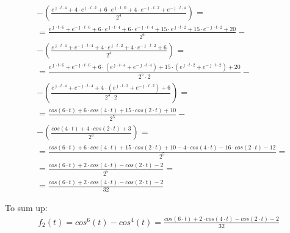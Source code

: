 \begin{task}
\begin{align*}
&-\left(\frac{e^{\jmath \cdot t \cdot 4} + 4 \cdot e^{\jmath \cdot t \cdot 2} + 6 \cdot e^{\jmath \cdot t \cdot 0} + 4 \cdot e^{-\jmath \cdot t \cdot 2} + e^{-\jmath \cdot t \cdot 4}}{2^4}\right)=\\
&=\frac{e^{\jmath \cdot t \cdot 6} + e^{-\jmath \cdot t \cdot 6} + 6 \cdot e^{\jmath \cdot t \cdot 4} + 6 \cdot e^{-\jmath \cdot t \cdot 4}  + 15 \cdot e^{\jmath \cdot t \cdot 2} + 15 \cdot e^{-\jmath \cdot t \cdot 2} + 20}{2^6} - \\
&-\left(\frac{e^{\jmath \cdot t \cdot 4} + e^{-\jmath \cdot t \cdot 4} + 4 \cdot e^{\jmath \cdot t \cdot 2} + 4 \cdot e^{-\jmath \cdot t \cdot 2} + 6}{2^4}\right)=\\
&=\frac{e^{\jmath \cdot t \cdot 6} + e^{-\jmath \cdot t \cdot 6} + 6 \cdot (e^{\jmath \cdot t \cdot 4} + e^{-\jmath \cdot t \cdot 4})  + 15 \cdot (e^{\jmath \cdot t \cdot 2} + e^{-\jmath \cdot t \cdot 2}) + 20}{2^5 \cdot 2} - \\
&-\left(\frac{e^{\jmath \cdot t \cdot 4} + e^{-\jmath \cdot t \cdot 4} + 4 \cdot (e^{\jmath \cdot t \cdot 2} + e^{-\jmath \cdot t \cdot 2}) + 6}{2^3 \cdot 2}\right)=\\
&=\frac{cos(6 \cdot t) + 6 \cdot cos(4 \cdot t) + 15 \cdot cos(2 \cdot t) + 10}{2^5} - \\
&-\left(\frac{cos(4 \cdot t) + 4 \cdot cos(2 \cdot t) + 3}{2^3}\right)=\\
&=\frac{cos(6 \cdot t) + 6 \cdot cos(4 \cdot t) + 15 \cdot cos(2 \cdot t) + 10 - 4 \cdot cos(4 \cdot t) - 16 \cdot cos(2 \cdot t) - 12}{2^5}=\\
&=\frac{cos(6 \cdot t) + 2 \cdot cos(4 \cdot t) - cos(2 \cdot t) - 2}{2^5}=\\
&=\frac{cos(6 \cdot t) + 2 \cdot cos(4 \cdot t) - cos(2 \cdot t) - 2}{32}
\end{align*}

To sum up:
\begin{align*}
f_{2}(t) =cos^6(t)-cos^4(t)=\frac{cos(6 \cdot t) + 2 \cdot cos(4 \cdot t) - cos(2 \cdot t) - 2}{32}
\end{align*}
\end{task}